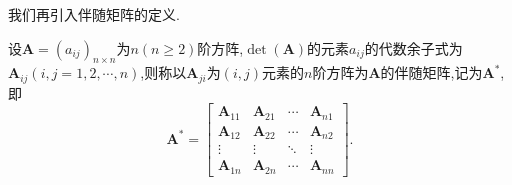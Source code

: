 我们再引入伴随矩阵的定义.
\begin{definition}
	设$\mathbf{A}=(a_{ij})_{n\times n}$为$n(n\ge2)$阶方阵,$\det(\mathbf{A})$的元素$a_{ij}$的代数余子式为$\mathbf{A}_{ij}(i,j=1,2,\cdots,n)$,则称以$\mathbf{A}_{ji}$为$\left(i,j\right)$元素的$n$阶方阵为$\mathbf{A}$的伴随矩阵,记为$\mathbf{A}^{\ast}$,即
	\[
		\mathbf{A}^{\ast}=
		\begin{bmatrix}
			\mathbf{A}_{11} & \mathbf{A}_{21} & \cdots & \mathbf{A}_{n1} \\
			\mathbf{A}_{12} & \mathbf{A}_{22} & \cdots & \mathbf{A}_{n2} \\
			\vdots          & \vdots          & \ddots & \vdots          \\
			\mathbf{A}_{1n} & \mathbf{A}_{2n} & \cdots & \mathbf{A}_{nn}
		\end{bmatrix}  .
	\]
\end{definition}
